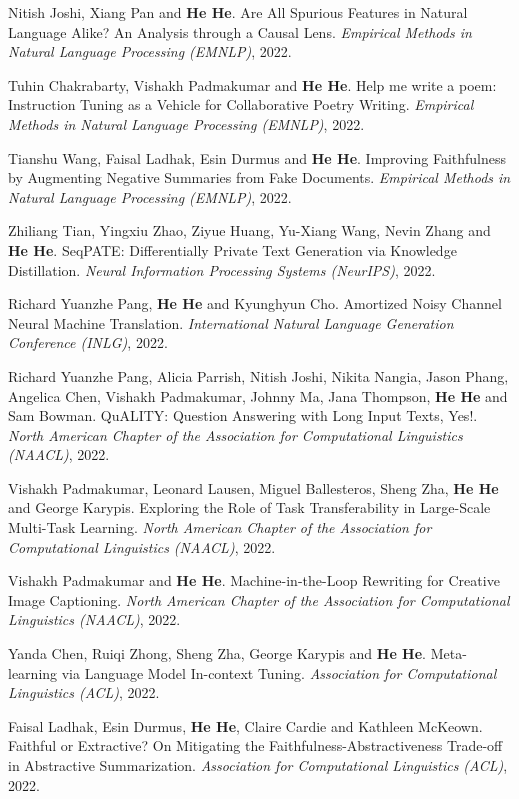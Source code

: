 Nitish Joshi, Xiang Pan and \textbf{He He}. Are All Spurious Features in Natural Language Alike? An Analysis through a Causal Lens. \textit{Empirical Methods in Natural Language Processing (EMNLP)}, 2022.

Tuhin Chakrabarty, Vishakh Padmakumar and \textbf{He He}. Help me write a poem: Instruction Tuning as a Vehicle for Collaborative Poetry Writing. \textit{Empirical Methods in Natural Language Processing (EMNLP)}, 2022.

Tianshu Wang, Faisal Ladhak, Esin Durmus and \textbf{He He}. Improving Faithfulness by Augmenting Negative Summaries from Fake Documents. \textit{Empirical Methods in Natural Language Processing (EMNLP)}, 2022.

Zhiliang Tian, Yingxiu Zhao, Ziyue Huang, Yu-Xiang Wang, Nevin Zhang and \textbf{He He}. SeqPATE: Differentially Private Text Generation via Knowledge Distillation. \textit{Neural Information Processing Systems (NeurIPS)}, 2022.

Richard Yuanzhe Pang, \textbf{He He} and Kyunghyun Cho. Amortized Noisy Channel Neural Machine Translation. \textit{International Natural Language Generation Conference (INLG)}, 2022.

Richard Yuanzhe Pang, Alicia Parrish, Nitish Joshi, Nikita Nangia, Jason Phang, Angelica Chen, Vishakh Padmakumar, Johnny Ma, Jana Thompson, \textbf{He He} and Sam Bowman. {QuALITY}: Question Answering with Long Input Texts, Yes!. \textit{North American Chapter of the Association for Computational Linguistics (NAACL)}, 2022.

Vishakh Padmakumar, Leonard Lausen, Miguel Ballesteros, Sheng Zha, \textbf{He He} and George Karypis. Exploring the Role of Task Transferability in Large-Scale Multi-Task Learning. \textit{North American Chapter of the Association for Computational Linguistics (NAACL)}, 2022.

Vishakh Padmakumar and \textbf{He He}. Machine-in-the-Loop Rewriting for Creative Image Captioning. \textit{North American Chapter of the Association for Computational Linguistics (NAACL)}, 2022.

Yanda Chen, Ruiqi Zhong, Sheng Zha, George Karypis and \textbf{He He}. Meta-learning via Language Model In-context Tuning. \textit{Association for Computational Linguistics (ACL)}, 2022.

Faisal Ladhak, Esin Durmus, \textbf{He He}, Claire Cardie and Kathleen McKeown. Faithful or Extractive? On Mitigating the Faithfulness-Abstractiveness Trade-off in Abstractive Summarization. \textit{Association for Computational Linguistics (ACL)}, 2022.

